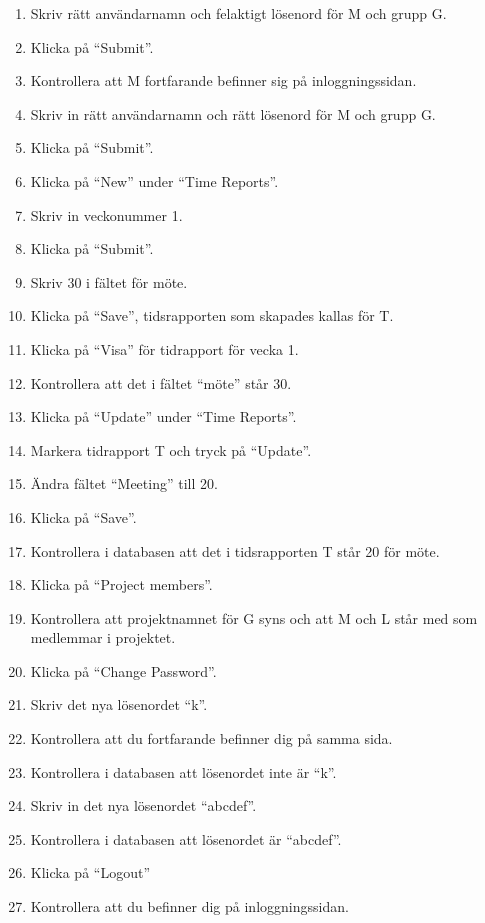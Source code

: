 \documentclass[a4paper]{article}
\begin{document}
\begin{ST}
\begin{enumerate}
\item Skriv rätt användarnamn och felaktigt lösenord för M och grupp G.
\item Klicka på ``Submit''.
\item Kontrollera att M fortfarande befinner sig på inloggningssidan.
\item Skriv in rätt användarnamn och rätt lösenord för M och grupp G.
\item Klicka på ``Submit''.
\item Klicka på ``New'' under ``Time Reports''.
\item Skriv in veckonummer 1.
\item Klicka på ``Submit''.
\item Skriv 30 i fältet för möte.
\item Klicka på ``Save'', tidsrapporten som skapades kallas för T.
\item Klicka på ``Visa'' för tidrapport för vecka 1.
\item Kontrollera att det i fältet ``möte'' står 30.
\item Klicka på ``Update'' under ``Time Reports''.
\item Markera tidrapport T och tryck på ``Update''.
\item Ändra fältet ``Meeting'' till 20.
\item Klicka på ``Save''.
\item Kontrollera i databasen att det i tidsrapporten T står 20 för möte.
\item Klicka på ``Project members''.
\item Kontrollera att projektnamnet för G syns och att M och L står med som medlemmar i projektet.
\item Klicka på ``Change Password''.
\item Skriv det nya lösenordet ``k''.
\item Kontrollera att du fortfarande befinner dig på samma sida.
\item Kontrollera i databasen att lösenordet inte är ``k''.
\item Skriv in det nya lösenordet ``abcdef''.
\item Kontrollera i databasen att lösenordet är ``abcdef''.
\item Klicka på ``Logout''
\item Kontrollera att du befinner dig på inloggningssidan.

\end{enumerate}

\end{ST}
\end{document}
